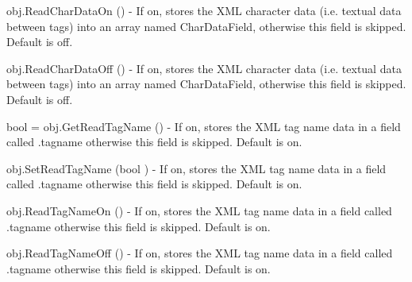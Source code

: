 \begin{DoxyItemize}
\item {\ttfamily obj.\-Read\-Char\-Data\-On ()} -\/ If on, stores the X\-M\-L character data (i.\-e. textual data between tags) into an array named Char\-Data\-Field, otherwise this field is skipped. Default is off.  
\item {\ttfamily obj.\-Read\-Char\-Data\-Off ()} -\/ If on, stores the X\-M\-L character data (i.\-e. textual data between tags) into an array named Char\-Data\-Field, otherwise this field is skipped. Default is off.  
\item {\ttfamily bool = obj.\-Get\-Read\-Tag\-Name ()} -\/ If on, stores the X\-M\-L tag name data in a field called .tagname otherwise this field is skipped. Default is on.  
\item {\ttfamily obj.\-Set\-Read\-Tag\-Name (bool )} -\/ If on, stores the X\-M\-L tag name data in a field called .tagname otherwise this field is skipped. Default is on.  
\item {\ttfamily obj.\-Read\-Tag\-Name\-On ()} -\/ If on, stores the X\-M\-L tag name data in a field called .tagname otherwise this field is skipped. Default is on.  
\item {\ttfamily obj.\-Read\-Tag\-Name\-Off ()} -\/ If on, stores the X\-M\-L tag name data in a field called .tagname otherwise this field is skipped. Default is on.  
\end{DoxyItemize}